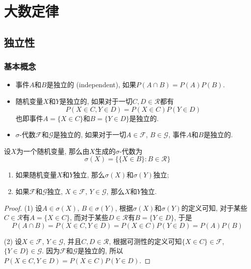 \documentclass[cn, 12pt, math=mtpro2, bibstyle=apa, blue, twocol]{elegantbook}
\newcommand{\F}{\mathcal{F}}
\begin{document}
\chapter{大数定律}
\section{独立性}
\subsection{基本概念}
\begin{definition}
\begin{itemize}
  \item 事件$A$和$B$是独立的 (independent), 如果$P(A\cap B)=P(A)P(B)$.
  \item 随机变量$X$和$Y$是独立的, 如果对于一切$C,D\in\mathcal{R}$都有
  $$P(X\in C,Y\in D)=P(X\in C)P(Y\in D)$$
  也即事件$A=\{X\in C\}$和$B=\{Y\in D\}$是独立的.
  \item $\sigma$-代数$\F$和$\mathcal{G}$是独立的, 如果对于一切$A\in\F$, $B\in\mathcal{G}$, 事件$A$和$B$是独立的.
\end{itemize}
\end{definition}
\begin{definition}
设$X$为一个随机变量, 那么由$X$生成的$\sigma$-代数为
$$\sigma(X)=\{\{X\in B\}: B\in\mathcal{R}\}$$
\end{definition}


\begin{theorem}\label{thm:thm2.1}
  \begin{enumerate}[label=(\arabic*)]
    \item 如果随机变量$X$和$Y$独立, 那么$\sigma(X)$和$\sigma(Y)$独立;
    \item 如果$\F$和$\mathcal{G}$独立, $X\in\F$, $Y\in\mathcal{G}$, 那么$X$和$Y$独立.
  \end{enumerate}
\end{theorem}
\begin{proof}
  (1) 设$A\in\sigma(X)$, $B\in\sigma(Y)$, 根据$\sigma(X)$和$\sigma(Y)$的定义可知, 对于某些$C\in\mathcal{R}$有$A=\{X\in C\}$, 而对于某些$D\in\mathcal{R}$有$B=\{Y\in D\}$, 于是
  $$P(A\cap B)=P(X\in C, Y\in D)=P(X\in C)P(Y\in D)=P(A)P(B)$$

  (2) 设$X\in\F$, $Y\in\mathcal{G}$, 并且$C,D\in\mathcal{R}$, 根据可测性的定义可知$\{X\in C\}\in\F$, $\{Y\in D\}\in\mathcal{G}$. 因为$\F$和$\mathcal{G}$是独立的, 所以$P(X\in C, Y\in D)=P(X\in C)P(Y\in D)$.
\end{proof}
\end{document}
